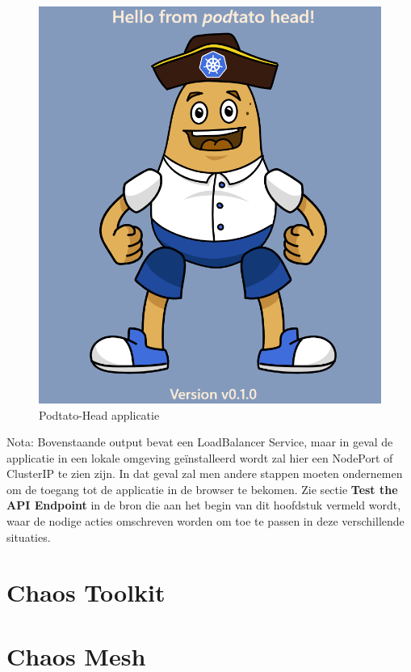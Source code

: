 \begin{figure}[h]
    \centering
    \includegraphics[scale=.5]{img/podtatohead-app.png}
    \caption{Podtato-Head applicatie}
    \label{img:podtato-head}
\end{figure}

Nota: Bovenstaande output bevat een LoadBalancer Service, maar in geval de applicatie in een lokale omgeving geïnstalleerd wordt zal hier een NodePort of ClusterIP te zien zijn. In dat geval zal men andere stappen moeten ondernemen om de toegang tot de applicatie in de browser te bekomen. 
Zie sectie {\bf Test the API Endpoint} in de bron die aan het begin van dit hoofdstuk vermeld wordt, waar de nodige acties omschreven worden om toe te passen in deze verschillende situaties.  

\section{Chaos Toolkit}

\section{Chaos Mesh}

